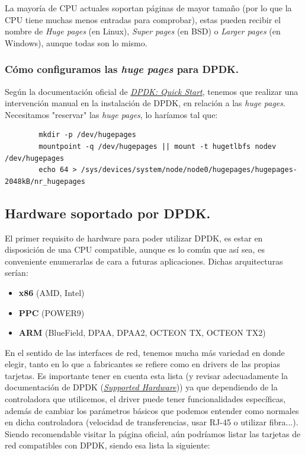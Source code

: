 \documentclass[12pt]{article}
\begin{document}
    \noindent La mayoría de CPU actuales soportan páginas de mayor tamaño (por lo que la CPU tiene muchas menos entradas para comprobar), estas pueden recibir el nombre de \emph{Huge pages} (en Linux), \emph{Super pages} (en BSD) o \emph{Larger pages} (en Windows), aunque todas son lo mismo.\\
    
    \subsubsection{Cómo configuramos las \emph{huge pages} para DPDK.}
    \noindent Según la documentación oficial de \hyperref[bib:link4]{\emph{DPDK: Quick Start}}, tenemos que realizar una intervención manual en la instalación de DPDK, en relación a las \emph{huge pages}. Necesitamos "reservar" las \emph{huge pages}, lo haríamos tal que: 
    
    \begin{verbatim}
    	mkdir -p /dev/hugepages
    	mountpoint -q /dev/hugepages || mount -t hugetlbfs nodev /dev/hugepages
    	echo 64 > /sys/devices/system/node/node0/hugepages/hugepages-2048kB/nr_hugepages
    \end{verbatim}

	\pagebreak

	\subsection{Hardware soportado por DPDK.}
	
	\noindent El primer requisito de hardware para poder utilizar DPDK, es estar en disposición de una CPU compatible, aunque es lo común que así sea, es conveniente enumerarlas de cara a futuras aplicaciones. Dichas arquitecturas serían:
	\begin{itemize}
		\item \textbf{x86} (AMD, Intel)
		
		\item \textbf{PPC} (POWER9)
		
		\item \textbf{ARM} (BlueField, DPAA, DPAA2, OCTEON TX, OCTEON TX2)
	\end{itemize}
	
	\noindent En el sentido de las interfaces de red, tenemos mucha más variedad en donde elegir, tanto en lo que a fabricantes se refiere como en drivers de las propias tarjetas. Es importante tener en cuenta esta lista (y revisar adecuadamente la documentación de DPDK (\hyperref[bib:link6]{\textit{Supported Hardware}})) ya que dependiendo de la controladora que utilicemos, el driver puede tener funcionalidades específicas, además de cambiar los parámetros básicos que podemos entender como normales en dicha controladora (velocidad de transferencias, usar RJ-45 o utilizar fibra...). Siendo recomendable visitar la página oficial, aún podríamos listar las tarjetas de red compatibles con DPDK, siendo esa lista la siguiente:
\end{document}
